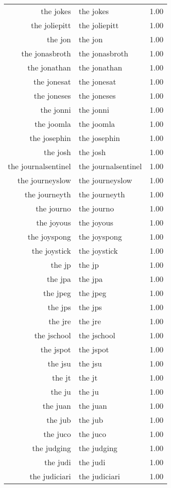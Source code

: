 \begin{table}[ht]
\begin{tabular}{rlr}
  the jokes & the jokes & 1.00 \\ 
  the joliepitt & the joliepitt & 1.00 \\ 
  the jon & the jon & 1.00 \\ 
  the jonasbroth & the jonasbroth & 1.00 \\ 
  the jonathan & the jonathan & 1.00 \\ 
  the jonesat & the jonesat & 1.00 \\ 
  the joneses & the joneses & 1.00 \\ 
  the jonni & the jonni & 1.00 \\ 
  the joomla & the joomla & 1.00 \\ 
  the josephin & the josephin & 1.00 \\ 
  the josh & the josh & 1.00 \\ 
  the journalsentinel & the journalsentinel & 1.00 \\ 
  the journeyslow & the journeyslow & 1.00 \\ 
  the journeyth & the journeyth & 1.00 \\ 
  the journo & the journo & 1.00 \\ 
  the joyous & the joyous & 1.00 \\ 
  the joyspong & the joyspong & 1.00 \\ 
  the joystick & the joystick & 1.00 \\ 
  the jp & the jp & 1.00 \\ 
  the jpa & the jpa & 1.00 \\ 
  the jpeg & the jpeg & 1.00 \\ 
  the jps & the jps & 1.00 \\ 
  the jre & the jre & 1.00 \\ 
  the jschool & the jschool & 1.00 \\ 
  the jspot & the jspot & 1.00 \\ 
  the jsu & the jsu & 1.00 \\ 
  the jt & the jt & 1.00 \\ 
  the ju & the ju & 1.00 \\ 
  the juan & the juan & 1.00 \\ 
  the jub & the jub & 1.00 \\ 
  the juco & the juco & 1.00 \\ 
  the judging & the judging & 1.00 \\ 
  the judi & the judi & 1.00 \\ 
  the judiciari & the judiciari & 1.00 \\ 

\end{tabular}
\end{table}
